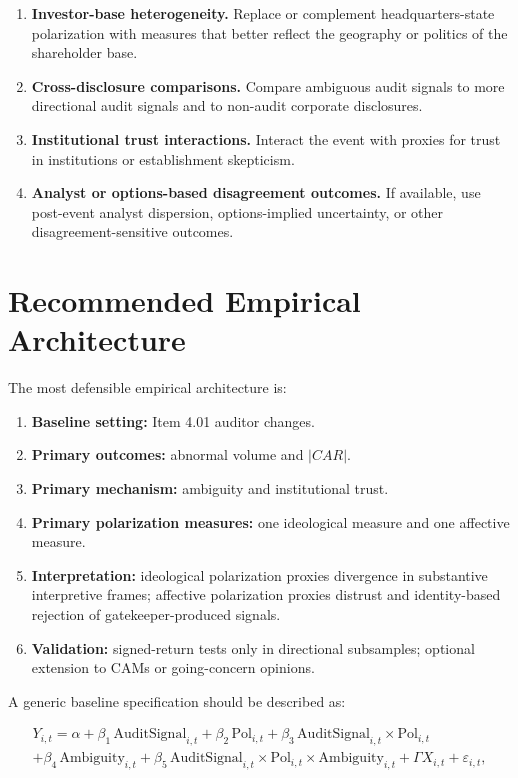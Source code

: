 \documentclass[12pt]{article}
\begin{document}
\begin{enumerate}[label=\textbf{I\arabic*.}]
    \item \textbf{Investor-base heterogeneity.} Replace or complement headquarters-state polarization with measures that better reflect the geography or politics of the shareholder base.
    \item \textbf{Cross-disclosure comparisons.} Compare ambiguous audit signals to more directional audit signals and to non-audit corporate disclosures.
    \item \textbf{Institutional trust interactions.} Interact the event with proxies for trust in institutions or establishment skepticism.
    \item \textbf{Analyst or options-based disagreement outcomes.} If available, use post-event analyst dispersion, options-implied uncertainty, or other disagreement-sensitive outcomes.
\end{enumerate}

\section{Recommended Empirical Architecture}

The most defensible empirical architecture is:

\begin{enumerate}[label=\textbf{E\arabic*.}]
    \item \textbf{Baseline setting:} Item 4.01 auditor changes.
    \item \textbf{Primary outcomes:} abnormal volume and $|CAR|$.
    \item \textbf{Primary mechanism:} ambiguity and institutional trust.
    \item \textbf{Primary polarization measures:} one ideological measure and one affective measure.
    \item \textbf{Interpretation:} ideological polarization proxies divergence in substantive interpretive frames; affective polarization proxies distrust and identity-based rejection of gatekeeper-produced signals.
    \item \textbf{Validation:} signed-return tests only in directional subsamples; optional extension to CAMs or going-concern opinions.
\end{enumerate}

A generic baseline specification should be described as:

\begin{align*}
Y_{i,t} = \alpha + \beta_1 \, \text{AuditSignal}_{i,t} + \beta_2 \, \text{Pol}_{i,t} + \beta_3 \, \text{AuditSignal}_{i,t} \times \text{Pol}_{i,t} \\
+ \beta_4 \, \text{Ambiguity}_{i,t} + \beta_5 \, \text{AuditSignal}_{i,t} \times \text{Pol}_{i,t} \times \text{Ambiguity}_{i,t} + \Gamma X_{i,t} + \varepsilon_{i,t},
\end{align*}
\end{document}
